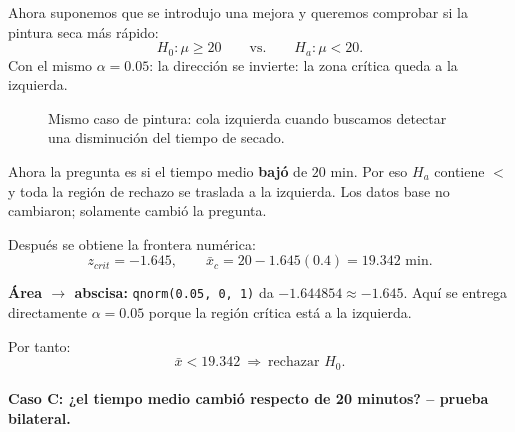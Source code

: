 \documentclass[11pt,a4paper]{article}
\begin{document}
Ahora suponemos que se introdujo una mejora y queremos comprobar si la pintura seca más rápido:
\[
H_0:\mu\ge20
\qquad\text{vs.}\qquad
H_a:\mu<20.
\]
Con el mismo $\alpha=0.05$:
la dirección se invierte: la zona crítica queda a la izquierda.

\begin{figure}[H]
\centering
{}
\caption{Mismo caso de pintura: cola izquierda cuando buscamos detectar una disminución del tiempo de secado.}
\end{figure}

\begin{observargrafico}
Ahora la pregunta es si el tiempo medio \textbf{bajó} de $20$ min. Por eso $H_a$ contiene $<$ y toda la región de rechazo se traslada a la izquierda. Los datos base no cambiaron; solamente cambió la pregunta.
\end{observargrafico}

Después se obtiene la frontera numérica:
\[
z_{crit}=-1.645,
\qquad
\bar{x}_c=20-1.645(0.4)=19.342\text{ min}.
\]
\begin{calculor}
\textbf{Área $\rightarrow$ abscisa:} \texttt{qnorm(0.05, 0, 1)} da $-1.644854\approx-1.645$. Aquí se entrega directamente $\alpha=0.05$ porque la región crítica está a la izquierda.
\end{calculor}
Por tanto:
\[
\boxed{\bar{x}<19.342\ \Rightarrow\ \text{rechazar }H_0.}
\]

\paragraph{Caso C: ¿el tiempo medio cambió respecto de 20 minutos? -- prueba bilateral.}
\end{document}
